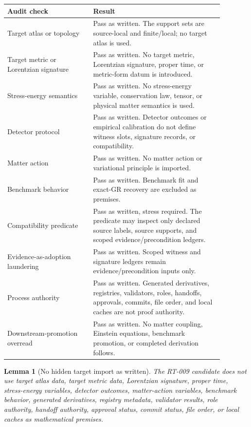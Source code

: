 \documentclass[11pt]{article}
\newtheorem{lemma}{Lemma}
\begin{document}
\begin{longtable}{p{0.35\linewidth}p{0.53\linewidth}}
\toprule
Audit check & Result \\
\midrule
Target atlas or topology & Pass as written. The support sets are source-local and finite/local; no target atlas is used. \\
Target metric or Lorentzian signature & Pass as written. No target metric, Lorentzian signature, proper time, or metric-form datum is introduced. \\
Stress-energy semantics & Pass as written. No stress-energy variable, conservation law, tensor, or physical matter semantics is used. \\
Detector protocol & Pass as written. Detector outcomes or empirical calibration do not define witness slots, signature records, or compatibility. \\
Matter action & Pass as written. No matter action or variational principle is imported. \\
Benchmark behavior & Pass as written. Benchmark fit and exact-GR recovery are excluded as premises. \\
Compatibility predicate & Pass as written, stress required. The predicate may inspect only declared source labels, source supports, and scoped evidence/precondition ledgers. \\
Evidence-as-adoption laundering & Pass as written. Scoped witness and signature ledgers remain evidence/precondition inputs only. \\
Process authority & Pass as written. Generated derivatives, registries, validators, roles, handoffs, approvals, commits, file order, and local caches are not proof authority. \\
Downstream-promotion overread & Pass as written. No matter coupling, Einstein equations, benchmark promotion, or completed derivation follows. \\
\bottomrule
\end{longtable}

\begin{lemma}[No hidden target import as written]
The RT-009 candidate does not use target atlas data, target metric data,
Lorentzian signature, proper time, stress-energy variables, detector
outcomes, matter-action variables, benchmark behavior, generated derivatives,
registry metadata, validator results, role authority, handoff authority,
approval status, commit status, file order, or local caches as mathematical
premises.
\end{lemma}
\end{document}

